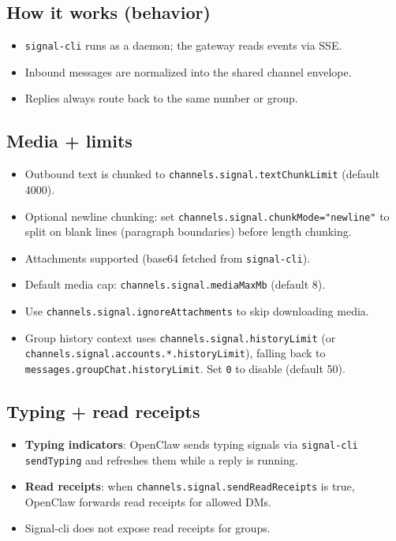 \subsection{How it works (behavior)}


\begin{itemize}
  \item \texttt{signal-cli} runs as a daemon; the gateway reads events via SSE.
  \item Inbound messages are normalized into the shared channel envelope.
  \item Replies always route back to the same number or group.
\end{itemize}


\subsection{Media + limits}


\begin{itemize}
  \item Outbound text is chunked to \texttt{channels.signal.textChunkLimit} (default 4000).
  \item Optional newline chunking: set \texttt{channels.signal.chunkMode="newline"} to split on blank lines (paragraph boundaries) before length chunking.
  \item Attachments supported (base64 fetched from \texttt{signal-cli}).
  \item Default media cap: \texttt{channels.signal.mediaMaxMb} (default 8).
  \item Use \texttt{channels.signal.ignoreAttachments} to skip downloading media.
  \item Group history context uses \texttt{channels.signal.historyLimit} (or \texttt{channels.signal.accounts.*.historyLimit}), falling back to \texttt{messages.groupChat.historyLimit}. Set \texttt{0} to disable (default 50).
\end{itemize}


\subsection{Typing + read receipts}


\begin{itemize}
  \item \textbf{Typing indicators}: OpenClaw sends typing signals via \texttt{signal-cli sendTyping} and refreshes them while a reply is running.
  \item \textbf{Read receipts}: when \texttt{channels.signal.sendReadReceipts} is true, OpenClaw forwards read receipts for allowed DMs.
  \item Signal-cli does not expose read receipts for groups.
\end{itemize}


